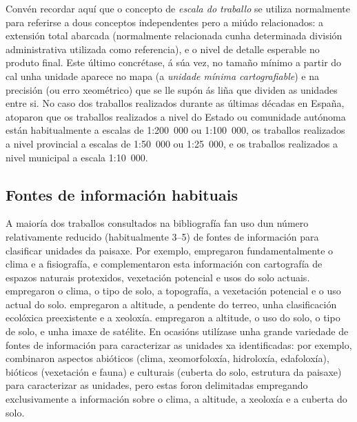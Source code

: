 \documentclass[11pt,a4paper]{article}
\begin{document}
Convén recordar aquí que o concepto de \emph{escala do traballo} se utiliza normalmente para referirse a dous conceptos independentes pero a miúdo relacionados: a extensión total abarcada (normalmente relacionada cunha determinada división administrativa utilizada como referencia), e o nivel de detalle esperable no produto final. Este último concrétase, á súa vez, no tamaño mínimo a partir do cal unha unidade aparece no mapa (a \emph{unidade mínima cartografiable}) e na precisión (ou erro xeométrico) que se lle supón ás liña que dividen as unidades entre si. No caso dos traballos realizados durante as últimas décadas en España, \citet{Valles2013} atoparon que os traballos realizados a nivel do Estado ou comunidade autónoma están habitualmente a escalas de 1:200~000 ou 1:100~000, os traballos realizados a nivel provincial a escalas de 1:50~000 ou 1:25~000, e os traballos realizados a nivel municipal a escala 1:10~000.





\subsection{Fontes de información habituais}

A maioría dos traballos consultados na bibliografía fan uso dun número relativamente reducido (habitualmente 3--5) de fontes de información para clasificar unidades da paisaxe. Por exemplo, \citet{Capotorti2012174} empregaron fundamentalmente o clima e a fisiografía, e complementaron esta información con cartografía de espazos naturais protexidos, vexetación potencial e usos do solo actuais. \citet{Chuman2010200} empregaron o clima, o tipo de solo, a topografía, a vexetación potencial e o uso actual do solo. \citet{Soto2010720} empregaron a altitude, a pendente do terreo, unha clasificación ecolóxica preexistente e a xeoloxía. \citet{VanEetvelde2009160} empregaron a altitude, o uso do solo, o tipo de solo, e unha imaxe de satélite. En ocasións utilízase unha grande variedade de fontes de información para caracterizar as unidades xa identificadas: por exemplo, \citet{Mucher201087} combinaron aspectos abióticos (clima, xeomorfoloxía, hidroloxía, edafoloxía), bióticos (vexetación e fauna) e culturais (cuberta do solo, estrutura da paisaxe) para caracterizar as unidades, pero estas foron delimitadas empregando exclusivamente a información sobre o clima, a altitude, a xeoloxía e a cuberta do solo.
\end{document}
